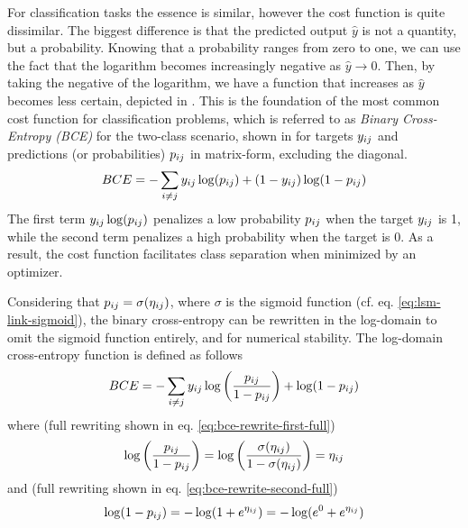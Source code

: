         For classification tasks the essence is similar, however the cost function is quite dissimilar. The biggest difference is that the predicted output $\hat{y}$ is not a quantity, but a probability. Knowing that a probability ranges from zero to one, we can use the fact that the logarithm becomes increasingly negative as $\hat{y}\rightarrow0$. Then, by taking the negative of the logarithm, we have a function that increases as $\hat{y}$ becomes less certain, depicted in .
        This is the foundation of the most common cost function for classification problems, which is referred to as \emph{Binary Cross-Entropy (BCE)} for the two-class scenario, shown in  for targets $\sub(y)$ and predictions (or probabilities) $\sub(p)$ in matrix-form, excluding the diagonal.
        \begin{equation}\label{eq:mopt-bceloss}
            BCE = -\sum_{i\neq j} \sub(y)\log(\sub(p))+(1-\sub(y))\log(1-\sub(p))
        \end{equation}
        The first term $\sub(y)\log(\sub(p))$ penalizes a low probability $\sub(p)$ when the target $\sub(y)$ is 1, while the second term penalizes a high probability when the target is 0. As a result, the cost function facilitates class separation when minimized by an optimizer.
        
        Considering that $\sub(p)=\sigma(\sub(\eta))$, where $\sigma$ is the sigmoid function (cf. eq. \ref{eq:lsm-link-sigmoid}), the binary cross-entropy can be rewritten in the log-domain to omit the sigmoid function entirely, and for numerical stability. The log-domain cross-entropy function is defined as follows
        \begin{equation}\label{eq:bce-log-domain}
            BCE = -\sum_{i\neq j} \sub(y)\log\left(\frac{\sub(p)}{1-\sub(p)}\right) + \log(1-\sub(p))
        \end{equation}
        where (full rewriting shown in eq. \ref{eq:bce-rewrite-first-full})
        \begin{equation}\label{eq:bce-rewrite-first}
            \log\left(\frac{\sub(p)}{1-\sub(p)}\right) =
            \log\left(\frac{\sigma(\sub(\eta))}{1-\sigma(\sub(\eta))}\right) = \sub(\eta)
        \end{equation}
        and (full rewriting shown in eq. \ref{eq:bce-rewrite-second-full})
        \begin{equation}\label{eq:bce-rewrite-second}
            \log(1-\sub(p))=-\log(1+e^{\sub(\eta)})=-\log(e^0+e^{\sub(\eta)})
        \end{equation}
        
